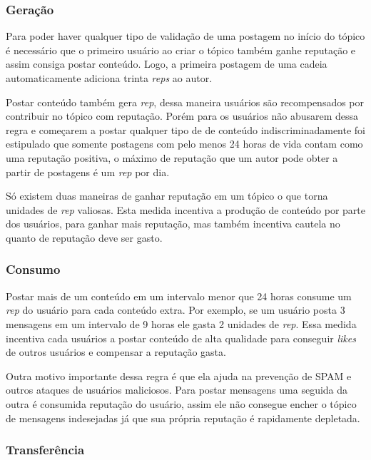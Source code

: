 \documentclass[12pt]{article}
\begin{document}
\subsubsection{Geração} \label{subsubsec:geracao}

Para poder haver qualquer tipo de validação de uma postagem no início do tópico é necessário que o primeiro usuário ao criar o tópico também ganhe reputação e assim consiga postar conteúdo. Logo, a primeira postagem de uma cadeia automaticamente adiciona trinta \emph{reps} ao autor. 

Postar conteúdo também gera \emph{rep}, dessa maneira usuários são recompensados por contribuir no tópico com reputação. Porém para os usuários não abusarem dessa regra e começarem a postar qualquer tipo de de conteúdo indiscriminadamente foi estipulado que somente postagens com pelo menos 24 horas de vida contam como uma reputação positiva, o máximo de reputação que um autor pode obter a partir de postagens é um \emph{rep} por dia. 

Só existem duas maneiras de ganhar reputação em um tópico o que torna unidades de \emph{rep} valiosas. Esta medida incentiva a produção de conteúdo por parte dos usuários, para ganhar mais reputação, mas também incentiva cautela no quanto de reputação deve ser gasto.  

\subsubsection{Consumo} \label{subsubsec:consumo}

Postar mais de um conteúdo em um intervalo menor que 24 horas consume um \emph{rep} do usuário para cada conteúdo extra. Por exemplo, se um usuário posta 3 mensagens em um intervalo de 9 horas ele gasta 2 unidades de \emph{rep}. Essa medida incentiva cada usuários a postar conteúdo de alta qualidade para conseguir \emph{likes} de outros usuários e compensar a reputação gasta.

Outra motivo importante dessa regra é que ela ajuda na prevenção de SPAM e outros ataques de usuários maliciosos. Para postar mensagens uma seguida da outra é consumida reputação do usuário, assim ele não consegue encher o tópico de mensagens indesejadas já que sua própria reputação é rapidamente depletada. 

\subsubsection{Transferência} \label{subsubsec:transfe}
\end{document}
